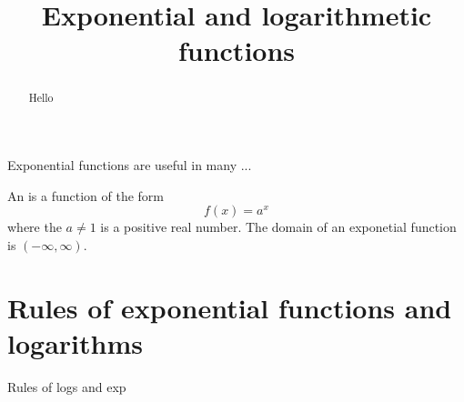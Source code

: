 \documentclass{ximera}
\title[Dig-In:]{Exponential and logarithmetic functions}
\begin{document}
\begin{abstract}
  Hello
\end{abstract}
\maketitle

Exponential functions are useful in many ... 


\begin{definition}
  An  is a function of the form
  \[
  f(x) = a^x
  \]
  where the $a\ne 1$ is a positive real number. The domain of an
  exponetial function is $(-\infty,\infty)$.
\end{definition}


\section{Rules of exponential functions and logarithms}
Rules of logs and exp
\end{document}
